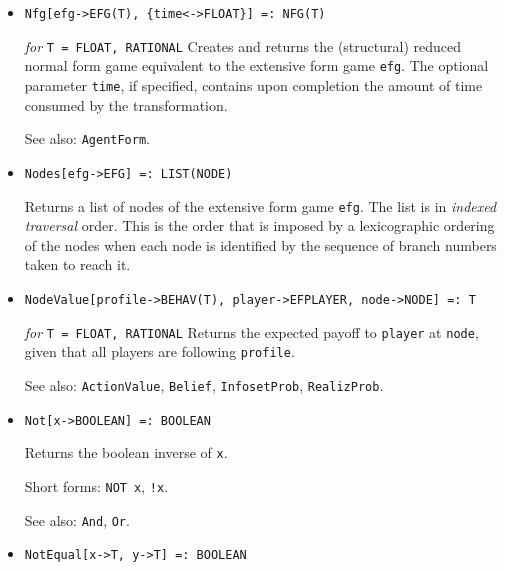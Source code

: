 \begin{itemize}
\item{}
\protect \large \begin{verbatim}
Nfg[efg->EFG(T), {time<->FLOAT}] =: NFG(T)
\end{verbatim}\normalsize

{\it for} {\tt T = FLOAT, RATIONAL}
\bd
Creates and returns the (structural) reduced normal form game equivalent
to the extensive form game \verb+efg+.  The optional parameter \verb+time+,
if specified, contains upon completion the amount of time consumed by
the transformation.
\item [See also:] \verb+AgentForm+.
\ed

\item{}
\protect \large \begin{verbatim}
Nodes[efg->EFG] =: LIST(NODE)
\end{verbatim}\normalsize

\bd
Returns a list of nodes of the extensive form game \verb+efg+.  The
list is in {\it indexed traversal} order.  This is the order that is
imposed by a lexicographic ordering of the nodes when each node is
identified by the sequence of branch numbers taken to reach it.  
\ed

\item{}
\protect \large \begin{verbatim}
NodeValue[profile->BEHAV(T), player->EFPLAYER, node->NODE] =: T
\end{verbatim}\normalsize

{\it for} {\tt T = FLOAT, RATIONAL}
\bd
Returns the expected payoff to \verb+player+ at \verb+node+, given
that all players are following \verb+profile+.
\item [See also:] \verb+ActionValue+, \verb+Belief+, \verb+InfosetProb+,
\verb+RealizProb+.
\ed

\item{}
\protect \large \begin{verbatim}
Not[x->BOOLEAN] =: BOOLEAN
\end{verbatim}\normalsize

\bd
Returns the boolean inverse of \verb+x+.
\item [Short forms:] \verb+NOT x+, \verb+!x+.
\item [See also:] \verb+And+, \verb+Or+.
\ed

\item{}
\protect \large \begin{verbatim}
NotEqual[x->T, y->T] =: BOOLEAN
\end{verbatim}\normalsize


\end{itemize}
